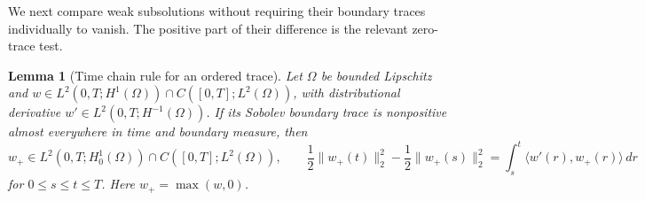 \documentclass[11pt,oneside,openany]{book}
\theoremstyle{plain}
\newtheorem{lemma}[theorem]{Lemma}
\theoremstyle{definition}
\theoremstyle{remark}
\begin{document}
We next compare weak subsolutions without requiring their
boundary traces individually to vanish. The positive part of
their difference is the relevant zero-trace test.

\begin{lemma}[Time chain rule for an ordered trace]
\label{pde:heat-positive-chain}
Let \(\Omega\) be bounded Lipschitz and
\(w\in L^2(0,T;H^1(\Omega))\cap C([0,T];L^2(\Omega))\), with
distributional derivative \(w'\in L^2(0,T;H^{-1}(\Omega))\).
If its Sobolev boundary trace is nonpositive almost everywhere
in time and boundary measure, then
\[
 w_+\in L^2(0,T;H^1_0(\Omega))\cap C([0,T];L^2(\Omega)),
 \qquad
 \frac12\|w_+(t)\|_2^2-\frac12\|w_+(s)\|_2^2
     =\int_s^t\langle w'(r),w_+(r)\rangle\,dr
\]
for \(0\leq s\leq t\leq T\). Here \(w_+=\max(w,0)\).
\end{lemma}
\end{document}
